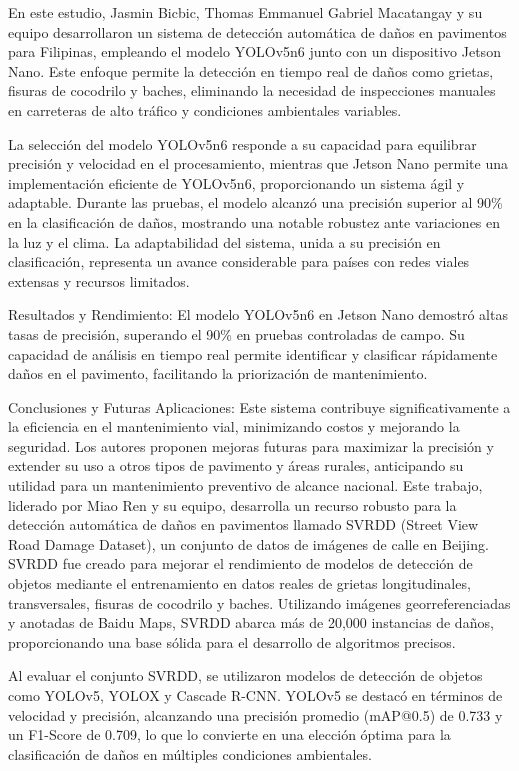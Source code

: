 \cite{bicbic2023automated} En este estudio, Jasmin Bicbic, Thomas Emmanuel Gabriel Macatangay y su equipo desarrollaron un sistema de detección automática de daños en pavimentos para Filipinas, empleando el modelo YOLOv5n6 junto con un dispositivo Jetson Nano. Este enfoque permite la detección en tiempo real de daños como grietas, fisuras de cocodrilo y baches, eliminando la necesidad de inspecciones manuales en carreteras de alto tráfico y condiciones ambientales variables.

La selección del modelo YOLOv5n6 responde a su capacidad para equilibrar precisión y velocidad en el procesamiento, mientras que Jetson Nano permite una implementación eficiente de YOLOv5n6, proporcionando un sistema ágil y adaptable. Durante las pruebas, el modelo alcanzó una precisión superior al 90\% en la clasificación de daños, mostrando una notable robustez ante variaciones en la luz y el clima. La adaptabilidad del sistema, unida a su precisión en clasificación, representa un avance considerable para países con redes viales extensas y recursos limitados.

Resultados y Rendimiento: El modelo YOLOv5n6 en Jetson Nano demostró altas tasas de precisión, superando el 90\% en pruebas controladas de campo. Su capacidad de análisis en tiempo real permite identificar y clasificar rápidamente daños en el pavimento, facilitando la priorización de mantenimiento.

Conclusiones y Futuras Aplicaciones: Este sistema contribuye significativamente a la eficiencia en el mantenimiento vial, minimizando costos y mejorando la seguridad. Los autores proponen mejoras futuras para maximizar la precisión y extender su uso a otros tipos de pavimento y áreas rurales, anticipando su utilidad para un mantenimiento preventivo de alcance nacional.
\cite{ren2024annotated} Este trabajo, liderado por Miao Ren y su equipo, desarrolla un recurso robusto para la detección automática de daños en pavimentos llamado SVRDD (Street View Road Damage Dataset), un conjunto de datos de imágenes de calle en Beijing. SVRDD fue creado para mejorar el rendimiento de modelos de detección de objetos mediante el entrenamiento en datos reales de grietas longitudinales, transversales, fisuras de cocodrilo y baches. Utilizando imágenes georreferenciadas y anotadas de Baidu Maps, SVRDD abarca más de 20,000 instancias de daños, proporcionando una base sólida para el desarrollo de algoritmos precisos.

Al evaluar el conjunto SVRDD, se utilizaron modelos de detección de objetos como YOLOv5, YOLOX y Cascade R-CNN. YOLOv5 se destacó en términos de velocidad y precisión, alcanzando una precisión promedio (mAP@0.5) de 0.733 y un F1-Score de 0.709, lo que lo convierte en una elección óptima para la clasificación de daños en múltiples condiciones ambientales.

